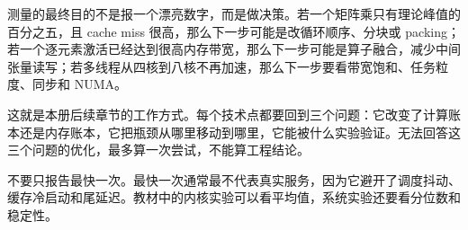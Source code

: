 测量的最终目的不是报一个漂亮数字，而是做决策。若一个矩阵乘只有理论峰值的百分之五，且 cache miss 很高，那么下一步可能是改循环顺序、分块或 packing；若一个逐元素激活已经达到很高内存带宽，那么下一步可能是算子融合，减少中间张量读写；若多线程从四核到八核不再加速，那么下一步要看带宽饱和、任务粒度、同步和 NUMA。

这就是本册后续章节的工作方式。每个技术点都要回到三个问题：它改变了计算账本还是内存账本，它把瓶颈从哪里移动到哪里，它能被什么实验验证。无法回答这三个问题的优化，最多算一次尝试，不能算工程结论。

\begin{warningbox}
不要只报告最快一次。最快一次通常最不代表真实服务，因为它避开了调度抖动、缓存冷启动和尾延迟。教材中的内核实验可以看平均值，系统实验还要看分位数和稳定性。
\end{warningbox}
